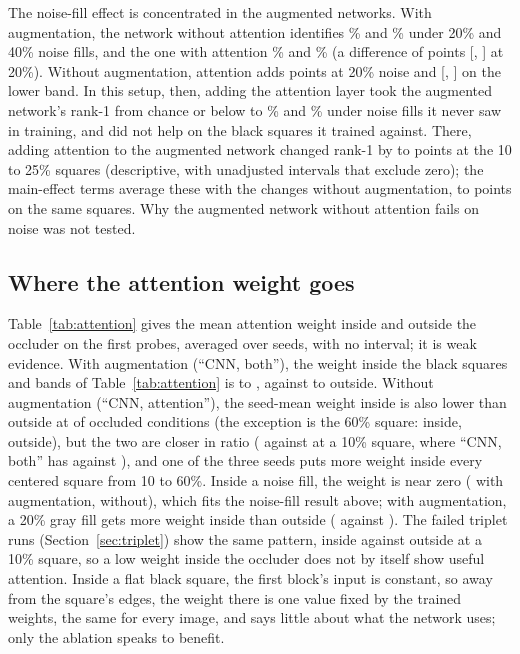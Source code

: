 The noise-fill effect is concentrated in the augmented networks. With augmentation, the network without attention identifies \% and \% under 20\% and 40\% noise fills, and the one with attention \% and \% (a difference of  points [, ] at 20\%). Without augmentation, attention adds  points at 20\% noise and  [, ] on the lower band. In this setup, then, adding the attention layer took the augmented network's rank-1 from chance or below to \% and \% under noise fills it never saw in training, and did not help on the black squares it trained against. There, adding attention to the augmented network changed rank-1 by  to  points at the 10 to 25\% squares (descriptive, with unadjusted intervals that exclude zero); the main-effect terms average these with the changes without augmentation,  to  points on the same squares. Why the augmented network without attention fails on noise was not tested.

\subsection{Where the attention weight goes}

Table~\ref{tab:attention} gives the mean attention weight inside and outside the occluder on the first  probes, averaged over  seeds, with no interval; it is weak evidence. With augmentation (``CNN, both''), the weight inside the black squares and bands of Table~\ref{tab:attention} is  to , against  to  outside. Without augmentation (``CNN, attention''), the seed-mean weight inside is also lower than outside at  of  occluded conditions (the exception is the 60\% square:  inside,  outside), but the two are closer in ratio ( against  at a 10\% square, where ``CNN, both'' has  against ), and one of the three seeds puts more weight inside every centered square from 10 to 60\%. Inside a noise fill, the weight is near zero ( with augmentation,  without), which fits the noise-fill result above; with augmentation, a 20\% gray fill gets more weight inside than outside ( against ). The failed triplet runs (Section~\ref{sec:triplet}) show the same pattern,  inside against  outside at a 10\% square, so a low weight inside the occluder does not by itself show useful attention. Inside a flat black square, the first block's input is constant, so away from the square's edges, the weight there is one value fixed by the trained weights, the same for every image, and says little about what the network uses; only the ablation speaks to benefit.

